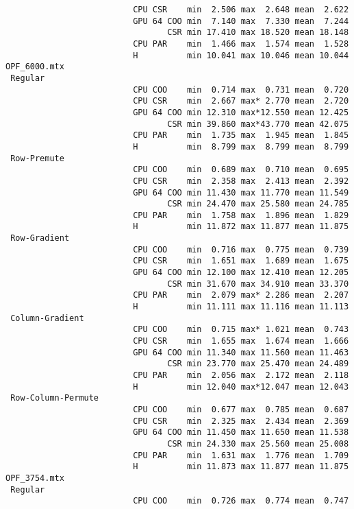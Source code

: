 {\begin{verbatim}
                          CPU CSR    min  2.506 max  2.648 mean  2.622
                          GPU 64 COO min  7.140 max  7.330 mean  7.244
                                 CSR min 17.410 max 18.520 mean 18.148
                          CPU PAR    min  1.466 max  1.574 mean  1.528
                          H          min 10.041 max 10.046 mean 10.044
OPF_6000.mtx
 Regular
                          CPU COO    min  0.714 max  0.731 mean  0.720
                          CPU CSR    min  2.667 max* 2.770 mean  2.720
                          GPU 64 COO min 12.310 max*12.550 mean 12.425
                                 CSR min 39.860 max*43.770 mean 42.075
                          CPU PAR    min  1.735 max  1.945 mean  1.845
                          H          min  8.799 max  8.799 mean  8.799
 Row-Premute
                          CPU COO    min  0.689 max  0.710 mean  0.695
                          CPU CSR    min  2.358 max  2.413 mean  2.392
                          GPU 64 COO min 11.430 max 11.770 mean 11.549
                                 CSR min 24.470 max 25.580 mean 24.785
                          CPU PAR    min  1.758 max  1.896 mean  1.829
                          H          min 11.872 max 11.877 mean 11.875
 Row-Gradient
                          CPU COO    min  0.716 max  0.775 mean  0.739
                          CPU CSR    min  1.651 max  1.689 mean  1.675
                          GPU 64 COO min 12.100 max 12.410 mean 12.205
                                 CSR min 31.670 max 34.910 mean 33.370
                          CPU PAR    min  2.079 max* 2.286 mean  2.207
                          H          min 11.111 max 11.116 mean 11.113
 Column-Gradient
                          CPU COO    min  0.715 max* 1.021 mean  0.743
                          CPU CSR    min  1.655 max  1.674 mean  1.666
                          GPU 64 COO min 11.340 max 11.560 mean 11.463
                                 CSR min 23.770 max 25.470 mean 24.489
                          CPU PAR    min  2.056 max  2.172 mean  2.118
                          H          min 12.040 max*12.047 mean 12.043
 Row-Column-Permute
                          CPU COO    min  0.677 max  0.785 mean  0.687
                          CPU CSR    min  2.325 max  2.434 mean  2.369
                          GPU 64 COO min 11.450 max 11.650 mean 11.538
                                 CSR min 24.330 max 25.560 mean 25.008
                          CPU PAR    min  1.631 max  1.776 mean  1.709
                          H          min 11.873 max 11.877 mean 11.875
OPF_3754.mtx
 Regular
                          CPU COO    min  0.726 max  0.774 mean  0.747

\end{verbatim}}
